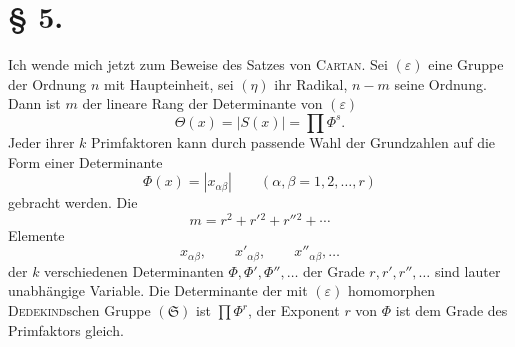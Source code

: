 \documentclass[11pt]{article}
\newcommand{\eps}{\varepsilon}
\newcommand{\grS}{\mathfrak{S}}
\begin{document}
\section*{§ 5.}

Ich wende mich jetzt zum Beweise des Satzes von \textsc{Cartan}. Sei $(\eps)$ eine Gruppe der Ordnung $n$ mit Haupteinheit, sei $(\eta)$ ihr Radikal, $n-m$ seine Ordnung. Dann ist $m$ der lineare Rang der Determinante von $(\eps)$
\begin{equation}\tag{1.}
 \Theta(x)=|S(x)|=\prod \Phi^{s}.
\end{equation}
Jeder ihrer $k$ Primfaktoren kann durch passende Wahl der Grundzahlen auf die Form einer Determinante
\begin{equation}\tag{2.}
 \Phi(x)=|x_{\alpha\beta}|\qquad(\alpha,\beta=1,2,\ldots,r)
\end{equation}
gebracht werden. Die
\begin{equation}\tag{3.}
 m=r^2+r'{}^2+r''{}^2+\cdots
\end{equation}
Elemente
\begin{equation}\tag{4.}
 x_{\alpha\beta},\qquad x'_{\alpha\beta},\qquad x''_{\alpha\beta},\ldots
\end{equation}
der $k$ verschiedenen Determinanten $\Phi,\Phi',\Phi'',\ldots$ der Grade $r,r',r'',\ldots$ sind lauter unabhängige Variable. Die Determinante der mit $(\eps)$ homomorphen \textsc{Dedekind}schen Gruppe $(\grS)$ ist $\prod \Phi^r$, der Exponent $r$ von $\Phi$ ist dem Grade des Primfaktors gleich.
\end{document}
